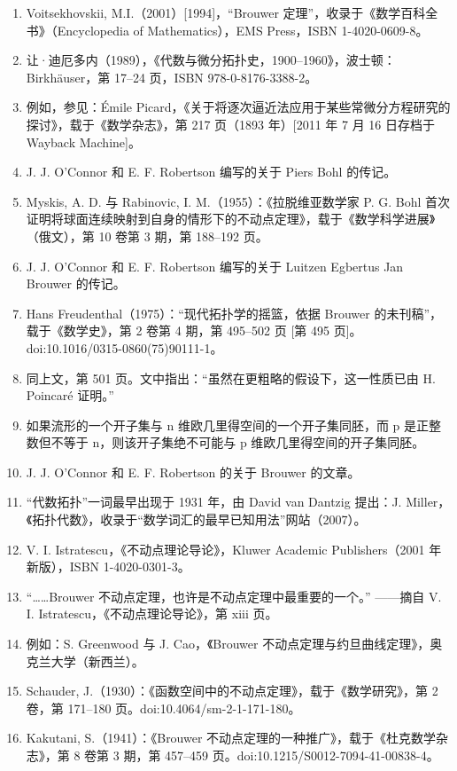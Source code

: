 \begin{enumerate}
\item Voitsekhovskii, M.I.（2001）[1994]，“Brouwer 定理”，收录于《数学百科全书》（Encyclopedia of Mathematics），EMS Press，ISBN 1-4020-0609-8。
\item 让·迪厄多内（1989），《代数与微分拓扑史，1900–1960》，波士顿：Birkhäuser，第 17–24 页，ISBN 978-0-8176-3388-2。
\item 例如，参见：Émile Picard，《关于将逐次逼近法应用于某些常微分方程研究的探讨》，载于《数学杂志》，第 217 页（1893 年）[2011 年 7 月 16 日存档于 Wayback Machine]。
\item J. J. O'Connor 和 E. F. Robertson 编写的关于 Piers Bohl 的传记。
\item Myskis, A. D. 与 Rabinovic, I. M.（1955）：《拉脱维亚数学家 P. G. Bohl 首次证明将球面连续映射到自身的情形下的不动点定理》，载于《数学科学进展》（俄文），第 10 卷第 3 期，第 188–192 页。
\item J. J. O'Connor 和 E. F. Robertson 编写的关于 Luitzen Egbertus Jan Brouwer 的传记。
\item Hans Freudenthal（1975）：“现代拓扑学的摇篮，依据 Brouwer 的未刊稿”，载于《数学史》，第 2 卷第 4 期，第 495–502 页 [第 495 页]。doi:10.1016/0315-0860(75)90111-1。
\item 同上文，第 501 页。文中指出：“虽然在更粗略的假设下，这一性质已由 H. Poincaré 证明。”
\item 如果流形的一个开子集与 n 维欧几里得空间的一个开子集同胚，而 p 是正整数但不等于 n，则该开子集绝不可能与 p 维欧几里得空间的开子集同胚。
\item J. J. O'Connor 和 E. F. Robertson 的关于 Brouwer 的文章。
\item “代数拓扑”一词最早出现于 1931 年，由 David van Dantzig 提出：J. Miller，《拓扑代数》，收录于“数学词汇的最早已知用法”网站（2007）。
\item V. I. Istratescu，《不动点理论导论》，Kluwer Academic Publishers（2001 年新版），ISBN 1-4020-0301-3。
\item “……Brouwer 不动点定理，也许是不动点定理中最重要的一个。” ——摘自 V. I. Istratescu，《不动点理论导论》，第 xiii 页。
\item 例如：S. Greenwood 与 J. Cao，《Brouwer 不动点定理与约旦曲线定理》，奥克兰大学（新西兰）。
\item Schauder, J.（1930）：《函数空间中的不动点定理》，载于《数学研究》，第 2 卷，第 171–180 页。doi:10.4064/sm-2-1-171-180。
\item Kakutani, S.（1941）：《Brouwer 不动点定理的一种推广》，载于《杜克数学杂志》，第 8 卷第 3 期，第 457–459 页。doi:10.1215/S0012-7094-41-00838-4。

\end{enumerate}
